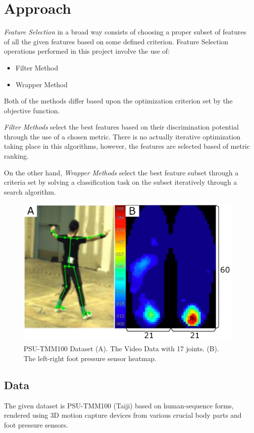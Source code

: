 \documentclass[12pt,twoside,a4paper]{article}
\begin{document}
\section{Approach}

\textit{Feature Selection} in a broad way consists of choosing a proper subset of features of all the given features based on some defined criterion. Feature Selection operations performed in this project involve the use of:
\begin{itemize}
    \item Filter Method
    \item Wrapper Method
\end{itemize}
Both of the methods differ based upon the optimization criterion set by the objective function.

\textit{Filter Methods} select the best features based on their discrimination potential through the use of a chosen metric. There is no actually iterative optimization taking place in this algorithms, however, the features are selected based of metric ranking. 

On the other hand, \textit{Wrapper Methods} select the best feature subset through a criteria set by solving a classification task on the subset iteratively through a search algorithm.

\begin{figure}
    \centering
    \includegraphics[width=0.7\linewidth]{data.png}
    \caption{PSU-TMM100 Dataset (A). The Video Data with 17 joints. (B). The left-right foot pressure sensor heatmap.}
    \label{fig: DATA}
\end{figure}

\subsection{Data}

The given dataset is PSU-TMM100 (Taiji) based on human-sequence forms, rendered using 3D motion capture devices from various crucial body parts and foot pressure sensors. 
\end{document}
